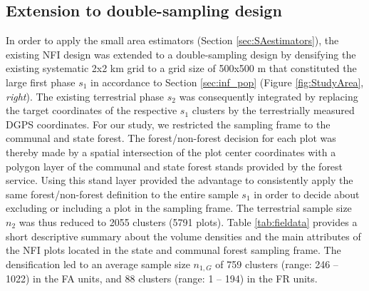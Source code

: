\subsection{Extension to double-sampling design}
\label{ext_to_2phase}

In order to apply the small area estimators (Section \ref{sec:SAestimators}), the existing NFI design was extended to a double-sampling design by densifying the existing systematic 2x2 km grid to a grid size of 500x500 m that constituted the large first phase $s_1$ in accordance to Section \ref{sec:inf_pop} (Figure \ref{fig:StudyArea}, \textit{right}). The existing terrestrial phase $s_2$ was consequently integrated by replacing the target coordinates of the respective $s_1$ clusters by the terrestrially measured DGPS coordinates. For our study, we restricted the sampling frame to the communal and state forest. The forest/non-forest decision for each plot was thereby made by a spatial intersection of the plot center coordinates with a polygon layer of the communal and state forest stands provided by the forest service. Using this stand layer provided the advantage to consistently apply the same forest/non-forest definition to the entire sample $s_1$ in order to decide about excluding or including a plot in the sampling frame. The terrestrial sample size $n_2$ was thus reduced to 2055 clusters (5791 plots). Table \ref{tab:fieldata} provides a short descriptive summary about the volume densities and the main attributes of the NFI plots located in the state and communal forest sampling frame. The densification led to an average sample size $n_{1,G}$ of 759  clusters (range: 246 -- 1022) in the FA units, and 88 clusters (range: 1 -- 194) in the FR units.




%
%
%
%


